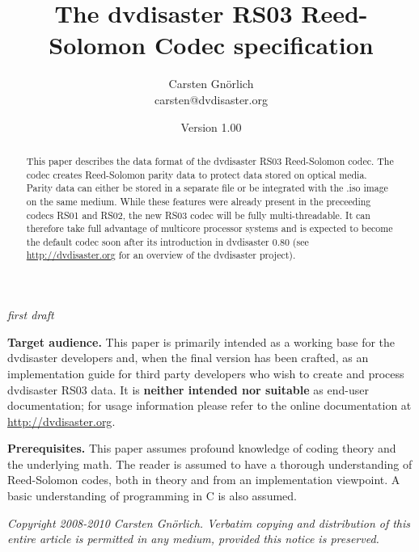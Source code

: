 \documentclass[12pt,a4paper,twoside]{article}
\begin{document}
\title{The dvdisaster RS03 Reed-Solomon Codec specification}
\author{Carsten Gnörlich\\carsten@dvdisaster.org}
\date{Version 1.00}
\maketitle
\begin{center}
{\em first draft}
\end{center}

\bigskip

\begin{abstract}
This paper describes the data format of the dvdisaster RS03 Reed-Solomon codec.
The codec creates Reed-Solomon parity data to protect data stored on optical media.
Parity data can either be stored in a separate file or be integrated with the .iso
image on the same medium. While these features were already present in the preceeding
codecs RS01 and RS02, the new RS03 codec will be fully multi-threadable.
It can therefore take full advantage of multicore processor systems and is expected
to become the default codec soon after its introduction in dvdisaster 0.80
(see \url{http://dvdisaster.org} for an overview of the dvdisaster project). 
\end{abstract}

\bigskip

{\bf Target audience.} This paper is primarily intended as a working base for the
dvdisaster developers and, when the final version has been crafted, as an implementation
guide for third party developers who wish to create and process dvdisaster RS03 data.
It is {\bf neither intended nor suitable} as end-user documentation; for usage information
please refer to the online documentation at \url{http://dvdisaster.org}.

\bigskip

{\bf Prerequisites.} This paper assumes profound knowledge of coding theory and the 
underlying math. The reader is assumed to have a thorough understanding of Reed-Solomon
codes, both in theory and from an implementation viewpoint. A basic understanding
of programming in C is also assumed.

\vfill
\begin{center}
{\em 
Copyright 2008-2010 Carsten Gnörlich.
Verbatim copying and distribution of this entire article is permitted in any medium, 
provided this notice is preserved.}
\end{center}

\newpage










\appendix






\end{document}
